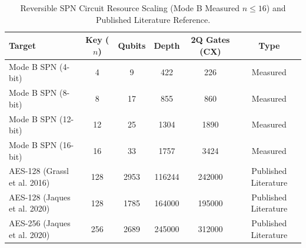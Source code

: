 \begin{table}[htbp]
\centering
\caption{Reversible SPN Circuit Resource Scaling (Mode B Measured $n \le 16$) and Published Literature Reference.}
\label{tab:exp6_scaling}
\begin{tabular}{lccccc}
\hline
\textbf{Target} & \textbf{Key ($n$)} & \textbf{Qubits} & \textbf{Depth} & \textbf{2Q Gates (CX)} & \textbf{Type} \\
\hline
Mode B SPN (4-bit) & 4 & 9 & 422 & 226 & Measured \\
Mode B SPN (8-bit) & 8 & 17 & 855 & 860 & Measured \\
Mode B SPN (12-bit) & 12 & 25 & 1304 & 1890 & Measured \\
Mode B SPN (16-bit) & 16 & 33 & 1757 & 3424 & Measured \\
AES-128 (Grassl et al. 2016) & 128 & 2953 & 116244 & 242000 & Published Literature \\
AES-128 (Jaques et al. 2020) & 128 & 1785 & 164000 & 195000 & Published Literature \\
AES-256 (Jaques et al. 2020) & 256 & 2689 & 245000 & 312000 & Published Literature \\
\hline
\end{tabular}
\end{table}
